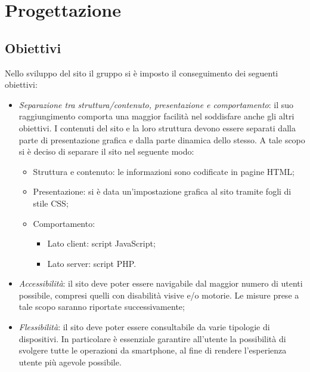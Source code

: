 \section{Progettazione}

\subsection{Obiettivi}
Nello sviluppo del sito il gruppo si è imposto il conseguimento dei seguenti obiettivi:
\begin{itemize}
	\item \textit{Separazione tra struttura/contenuto, presentazione e comportamento}: il suo
	raggiungimento comporta una maggior facilità nel soddisfare anche gli altri obiettivi. I
	contenuti del sito e la loro struttura devono essere separati dalla parte di presentazione grafica e
	dalla parte dinamica dello stesso. A tale scopo si è deciso di separare il sito nel seguente modo:
	\begin{itemize}
		\item Struttura e contenuto: le informazioni sono codificate in pagine HTML;
		\item Presentazione: si è data un'impostazione grafica al sito tramite fogli di stile CSS;
		\item Comportamento:
		\begin{itemize}
			\item Lato client: script JavaScript;
			\item Lato server: script PHP.
		\end{itemize}
	\end{itemize}
	\item \textit{Accessibilità}: il sito deve poter essere navigabile dal maggior numero di utenti
	possibile, compresi quelli con disabilità visive e/o motorie. Le misure prese a tale scopo saranno
	riportate successivamente;
	\item \textit{Flessibilità}: il sito deve poter essere consultabile da varie tipologie di
	dispositivi. In particolare è essenziale garantire all'utente la possibilità di svolgere tutte le
	operazioni da smartphone, al fine di rendere l'esperienza utente più agevole possibile.
\end{itemize}

